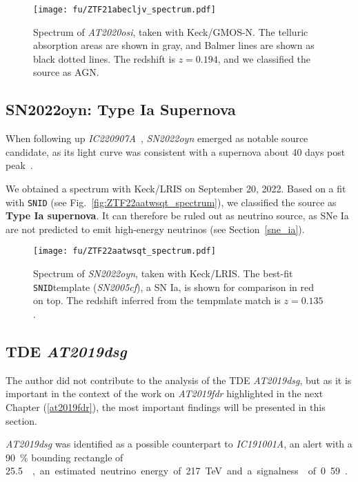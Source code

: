 \begin{figure}[htb]
    \texttt{[image: fu/ZTF21abecljv\_spectrum.pdf]}
    \caption[\emph{AT2020osi} spectrum]{Spectrum of \emph{AT2020osi}, taken with Keck/GMOS-N. The telluric absorption areas are shown in gray, and Balmer lines are shown as black dotted lines. The redshift is $z= 0.194$, and we classified the source as AGN.}
\end{figure}


\subsection{SN2022oyn: Type Ia Supernova}
When following up \emph{IC220907A}~, \emph{SN2022oyn} emerged as notable source candidate, as its light curve was consistent with a supernova about 40 days post peak~.

We obtained a spectrum with Keck/LRIS on September 20, 2022. Based on a fit with \texttt{SNID} (see Fig.~\ref{fig:ZTF22aatwsqt_spectrum}), we classified the source as \textbf{Type Ia supernova}. It can therefore be ruled out as neutrino source, as SNe Ia are not predicted to emit high-energy neutrinos (see Section~\ref{sne_ia}).

\begin{figure}[htb]
    \texttt{[image: fu/ZTF22aatwsqt\_spectrum.pdf]}
    \caption[\emph{SN2022oyn} spectrum]{Spectrum of \emph{SN2022oyn}, taken with Keck/LRIS. The best-fit \texttt{SNID}template (\emph{SN2005cf}), a SN Ia, is shown for comparison in red on top. The redshift inferred from the tempmlate match is $z=0.135$.}
\end{figure}

\subsection{TDE \emph{AT2019dsg}}
The author did not contribute to the analysis of the TDE \emph{AT2019dsg}, but as it is important in the context of the work on \emph{AT2019fdr} highlighted in the next Chapter (\ref{at2019fdr}), the most important findings will be presented in this section.

\emph{AT2019dsg} was identified as a possible counterpart to \emph{IC191001A}, an alert with a \SI{90}{\percent} bounding rectangle of \SI{25.5}{\square\deg}, an estimated neutrino energy of \SI{217}{\tera\eV} and a signalness of 0.59~.

